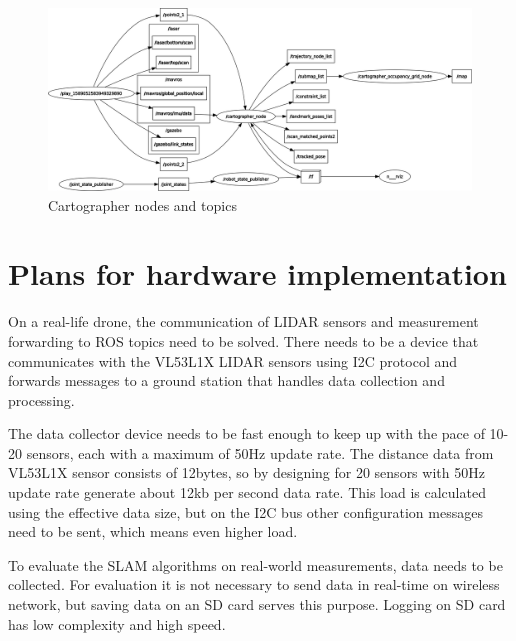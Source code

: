 \begin{figure}[!ht]
    \centering
    \includegraphics[width=130mm, keepaspectratio]{figures/cartographer_nodes.png}
    \caption{Cartographer nodes and topics}
    \label{fig:cartographer_nodes}
\end{figure}










\newpage


\section{Plans for hardware implementation}
On a real-life drone, the communication of LIDAR sensors and measurement forwarding to ROS topics need
to be solved. There needs to be a device that communicates with the VL53L1X LIDAR sensors using I2C
protocol and forwards messages to a ground station that handles data collection and processing.

The data collector device needs to be fast enough to keep up with the pace of 10-20 sensors,
each with a maximum of 50Hz update rate. The distance data from VL53L1X sensor consists of 12bytes, 
so by designing for 20 sensors with 50Hz update rate generate about 12kb per second data rate. This 
load is calculated using the effective data size, but on the I2C bus other configuration messages 
need to be sent, which means even higher load.

To evaluate the SLAM algorithms on real-world measurements, data needs to be collected. 
For evaluation it is not necessary to send data in real-time on wireless network, but saving 
data on an SD card serves this purpose. Logging on SD card has low complexity and high speed. 


